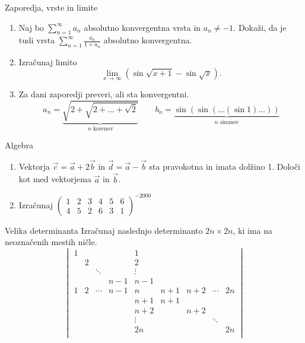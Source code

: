 \begin{frame}{Zaporedja, vrste in limite}
	\begin{enumerate}
		\item 
		Naj bo \(\sum_{n=1}^{\infty}a_n\) absolutno konvergentna vrsta in $a_n \ne -1$.
		Dokaži, da je tudi vrsta $\sum_{n=1}^\infty \frac{a_n}{1+a_n}$
		absolutno konvergentna.

		\item
		Izračunaj limito
		\[\lim_{x \to \infty} (\sin \sqrt{x+1} - \sin \sqrt{x}).\]

		\item
		Za dani zaporedji preveri, ali sta konvergentni.
		\[a_n = \underbrace{\sqrt{2+\sqrt{2+\dots+\sqrt{2}}}}_{\text{\(n\) korenov}} \qquad
		b_n = \underbrace{\sin(\sin(\dots(\sin 1)\dots))}_{\text{\(n\) sinusov}}\]
	\end{enumerate}
\end{frame}

\begin{frame}{Algebra}
	\begin{enumerate}
		\item
		Vektorja \(\vec{c}=\vec{a} + 2\vec{b}\) in \(\vec{d} = \vec{a}-\vec{b}\)
		sta pravokotna in imata dolžino 1. Določi kot med vektorjema $\vec{a}$ in $\vec{b}$.
		\item 
		Izračunaj
		\(\begin{pmatrix}
			1 & 2 & 3 & 4 & 5 & 6 \\
			4 & 5 & 2 & 6 & 3 & 1
			\end{pmatrix}^{-2000}\)
	\end{enumerate}
\end{frame}

\begin{frame}{Velika determinanta}
	Izračunaj naslednjo determinanto $2n \times 2n$, ki ima na neoznačenih mestih ničle.
	\[\begin{vmatrix}
		1 & & & & 1 &&&& \\
	    & 2&& & 2 &&&& \\
		&& \ddots&& \vdots &&&&\\
		&&& n-1 & n-1 &&&&\\
		1&2& \cdots & n-1 & n & n+1 & n+2 & \cdots & 2n\\
		&&&& n+1 & n+1 &&&\\
		&&&&n+2 && n+2 &&\\
		&&&& \vdots &&& \ddots &\\
		&&&& 2n &&&& 2n\\
		\end{vmatrix}\]
\end{frame}

